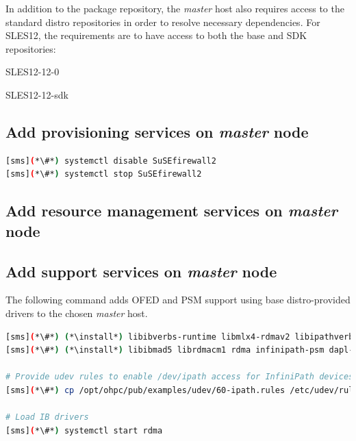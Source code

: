 \documentclass[letterpaper]{article}
\newcommand{\baseOS}{SLES12}
\newcommand{\install}{zypper -n install}
\begin{document}
In addition to the \OHPC{} package repository, the {\em master} host also
requires access to the standard distro repositories in order to resolve
necessary dependencies. For \baseOS{}, the requirements are to have access to
both the base and SDK repositories:

\begin{itemize*}
\item SLES12-12-0
\item SLES12-12-sdk
\end{itemize*}



\subsection{Add provisioning services on {\em master} node} \label{sec:add_provisioning}



\begin{lstlisting}[language=bash,keywords={}]
[sms](*\#*) systemctl disable SuSEfirewall2
[sms](*\#*) systemctl stop SuSEfirewall2
\end{lstlisting}



\subsection{Add resource management services on {\em master} node} \label{sec:add_rm}


\subsection{Add \InfiniBand{} support services on {\em master} node} \label{sec:add_ofed}

The following command adds OFED and PSM support using base distro-provided drivers
to the chosen {\em master} host.

\begin{lstlisting}[language=bash,keywords={}]
[sms](*\#*) (*\install*) libibverbs-runtime libmlx4-rdmav2 libipathverbs-rdmav2
[sms](*\#*) (*\install*) libibmad5 librdmacm1 rdma infinipath-psm dapl-devel dapl-utils 

# Provide udev rules to enable /dev/ipath access for InfiniPath devices
[sms](*\#*) cp /opt/ohpc/pub/examples/udev/60-ipath.rules /etc/udev/rules.d/

# Load IB drivers
[sms](*\#*) systemctl start rdma
\end{lstlisting}
\end{document}
